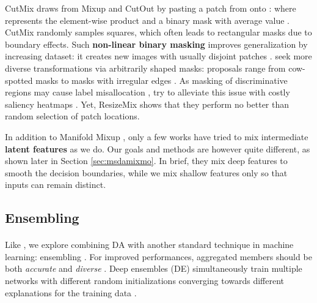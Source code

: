 \documentclass[10pt,twocolumn,letterpaper]{article}
\begin{document}
CutMix draws from Mixup and CutOut
\cite{devries2017improved} by pasting a patch from  onto : 
 where  represents the element-wise
product and  a binary mask with average
value . CutMix randomly samples squares, which often leads to rectangular masks due to boundary effects. Such
\textbf{non-linear binary masking} improves generalization
\cite{summers2019improved,takahashi2019data} by increasing dataset: it creates new images with usually disjoint patches
\cite{harris2020mix}.
\cite{BAEK2021107594,faramarzi2020patchup,lee2020smoothmix} seek more diverse transformations
via arbitrarily shaped masks: proposals range from
cow-spotted masks \cite{french2020milking} to masks with irregular
edges \cite{harris2020mix}.
As masking of discriminative regions may cause label
misallocation \cite{guo2019mixup},
\cite{kim2021comixup,kim2020puzzle,uddin2020saliencymix,walawalkar2020attentive}
try to alleviate this issue with costly saliency heatmaps
\cite{selvaraju2017grad}. Yet, ResizeMix \cite{qin2020resizemix} shows that they
perform no better than random selection of patch locations.


In addition to Manifold Mixup \cite{manifoldmixup19}, only a few works \cite{faramarzi2020patchup,li2020n,yaguchi2019mixfeat,yun2019cutmix} have
tried to mix intermediate \textbf{latent features} as we do.
Our goals and methods are however quite different, as shown later in Section \ref{sec:msdamixmo}.
In brief, they mix deep features to smooth the decision boundaries, while we mix shallow features only so that inputs can remain distinct.

\subsection{Ensembling}

\paragraph{}Like \cite{wen2021combining}, we explore combining DA with another standard technique in machine learning: ensembling \cite{dietterich2000ensemble,hansen1990neural,krogh1995neural}. For improved performances, aggregated members should be both \textit{accurate} and \textit{diverse} \cite{opitz1999popular,perrone1992networks,rame2021dice}.
Deep ensembles \cite{lakshminarayanan2016simple} (DE) simultaneously train multiple networks with different random initializations \cite{kolen1991back} converging towards different explanations for the
training data \cite{fort2019deep,wilson2020bayesian}.
\end{document}
